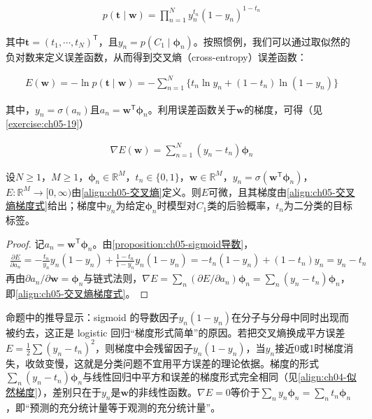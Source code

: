 \documentclass[../../main.tex]{subfiles}
\begin{document}
\begin{align}
  p(\boldsymbol{t}\mid\boldsymbol{w})=\prod_{n=1}^{N}y_n^{t_n}(1-y_n)^{1-t_n}
  \label{align:ch05-logistic似然}
\end{align}

其中$\boldsymbol{t}=(t_1,\cdots,t_N)^{\mathsf{T}}$，且$y_n=p(C_1\mid\boldsymbol{\phi}_n)$。按照惯例，我们可以通过取似然的负对数来定义误差函数，从而得到交叉熵（cross-entropy）误差函数：

\begin{align}
  E(\boldsymbol{w})=-\ln p(\boldsymbol{t}\mid\boldsymbol{w})=-\sum_{n=1}^{N}\bigl\{t_n\ln y_n+(1-t_n)\ln(1-y_n)\bigr\}
  \label{align:ch05-交叉熵}
\end{align}

其中，$y_n=\sigma(a_n)$且$a_n=\boldsymbol{w}^{\mathsf{T}}\boldsymbol{\phi}_n$。利用误差函数关于$\boldsymbol{w}$的梯度，可得（见\cref{exercise:ch05-19}）

\begin{align}
  \nabla E(\boldsymbol{w})=\sum_{n=1}^{N}(y_n-t_n)\boldsymbol{\phi}_n
  \label{align:ch05-交叉熵梯度式}
\end{align}

\begin{proposition}[交叉熵误差的梯度]\label{proposition:ch05-交叉熵梯度}
设$N\geqslant1$，$M\geqslant1$，$\boldsymbol{\phi}_n\in\mathbb{R}^{M}$，$t_n\in\{0,1\}$，$\boldsymbol{w}\in\mathbb{R}^{M}$，$y_n=\sigma(\boldsymbol{w}^{\mathsf{T}}\boldsymbol{\phi}_n)$，$E:\mathbb{R}^{M}\to[0,\infty)$由\eqref{align:ch05-交叉熵}定义。则$E$可微，且其梯度由\eqref{align:ch05-交叉熵梯度式}给出；梯度中$y_n$为给定$\boldsymbol{\phi}_n$时模型对$C_1$类的后验概率，$t_n$为二分类的目标标签。
\end{proposition}

\begin{proof}
记$a_n=\boldsymbol{w}^{\mathsf{T}}\boldsymbol{\phi}_n$。由\cref{proposition:ch05-sigmoid导数}，
\begin{align}
  \frac{\partial E}{\partial a_n}=-\frac{t_n}{y_n}y_n(1-y_n)+\frac{1-t_n}{1-y_n}y_n(1-y_n)=-t_n(1-y_n)+(1-t_n)y_n=y_n-t_n
\end{align}
再由$\partial a_n/\partial\boldsymbol{w}=\boldsymbol{\phi}_n$与链式法则，$\nabla E=\sum_n(\partial E/\partial a_n)\boldsymbol{\phi}_n=\sum_n(y_n-t_n)\boldsymbol{\phi}_n$，即\eqref{align:ch05-交叉熵梯度式}。
\end{proof}

\begin{remark}
命题中的推导显示：sigmoid 的导数因子$y_n(1-y_n)$在分子与分母中同时出现而被约去，这正是 logistic 回归“梯度形式简单”的原因。若把交叉熵换成平方误差$E=\frac12\sum(y_n-t_n)^2$，则梯度中会残留因子$y_n(1-y_n)$，当$y_n$接近0或1时梯度消失，收敛变慢，这就是分类问题不宜用平方误差的理论依据。梯度的形式$\sum_n(y_n-t_n)\boldsymbol{\phi}_n$与线性回归中平方和误差的梯度形式完全相同（见\cref{align:ch04-似然梯度}），差别只在于$y_n$是$\boldsymbol{w}$的非线性函数。$\nabla E=0$等价于$\sum_n y_n\boldsymbol{\phi}_n=\sum_n t_n\boldsymbol{\phi}_n$，即“预测的充分统计量等于观测的充分统计量”。
\end{remark}
\end{document}
